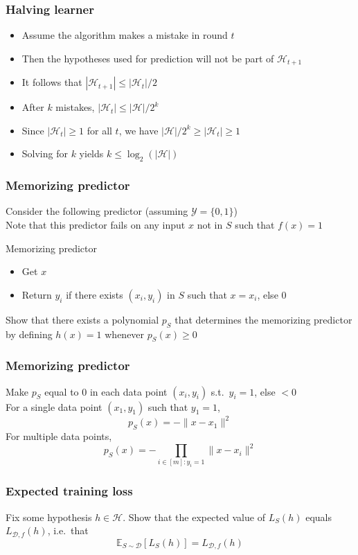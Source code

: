 \documentclass[10pt]{beamer}
\begin{document}
\begin{frame}
  \frametitle{Halving learner}
  \begin{itemize}
	\item Assume the algorithm makes a mistake in round $t$
	\pause
	\item Then the hypotheses used for prediction will {\color{red} not} be part of $\mathcal{H}_{t+1}$
	\pause
	\item It follows that $|\mathcal{H}_{t+1}|\leq |\mathcal{H}_t| / 2$
	\pause
	\item After $k$ mistakes, $|\mathcal{H}_t| \leq |\mathcal{H}| / 2^k$
	\pause
	\item Since $|\mathcal{H}_t|\geq 1$ for all $t$, we have $|\mathcal{H}| / 2^k \geq |\mathcal{H}_t| \geq 1$
	\pause
	\item Solving for $k$ yields $k \leq \log_2(|\mathcal{H}|)$
  \end{itemize}
\end{frame}

\begin{frame}
  \frametitle{Memorizing predictor}
  Consider the following predictor (assuming $\mathcal{Y}=\{0,1\}$)\\
  Note that this predictor fails on {\color{red} any} input $x$ not in $S$ such that $f(x)=1$
  \begin{block}{Memorizing predictor}
	\begin{itemize}
	\item Get $x$
	\item Return $y_i$ if there exists $(x_i,y_i)$ in $S$ such that $x=x_i$, else 0
	\end{itemize}
  \end{block}
  Show that there exists a polynomial $p_S$ that determines the memorizing predictor by defining $h(x)=1$ whenever $p_S(x)\geq 0$
\end{frame}

\begin{frame}
  \frametitle{Memorizing predictor}
  Make $p_S$ equal to 0 in each data point $(x_i,y_i)$ s.t.~$y_i=1$, else $< 0$\\
  \vspace*{0.5cm}
  \pause
  For a single data point $(x_1,y_1)$ such that $y_1=1$,
  \[
  p_S(x) = - \lVert x - x_1 \rVert^2
  \]
  \pause
  For multiple data points,
  \[
  p_S(x) = - \prod_{i\in[m]:y_i=1} \lVert x - x_i \rVert^2
  \]
\end{frame}

\begin{frame}
  \frametitle{Expected training loss}
  Fix some hypothesis $h\in\mathcal{H}$. Show that the expected value of $L_S(h)$ equals $L_{\mathcal{D},f}(h)$, i.e.~that
  \[
  \mathbb{E}_{S\sim\mathcal{D}}[L_S(h)] = L_{\mathcal{D},f}(h)
  \]
\end{frame}
\end{document}
